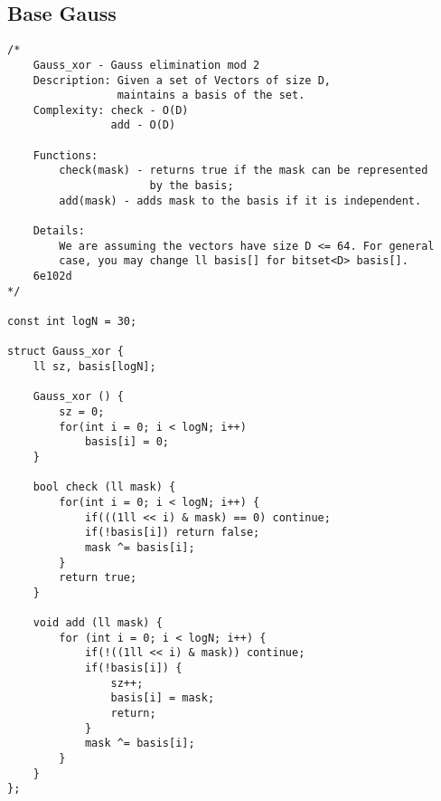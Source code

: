\documentclass{article}
\begin{document}
\subsection{Base Gauss}
\begin{verbatim}
/*
    Gauss_xor - Gauss elimination mod 2
    Description: Given a set of Vectors of size D,
                 maintains a basis of the set.
    Complexity: check - O(D)
                add - O(D)

    Functions:
        check(mask) - returns true if the mask can be represented
                      by the basis;
        add(mask) - adds mask to the basis if it is independent.

    Details:
        We are assuming the vectors have size D <= 64. For general
        case, you may change ll basis[] for bitset<D> basis[].
    6e102d
*/

const int logN = 30;

struct Gauss_xor {
    ll sz, basis[logN];

    Gauss_xor () {
        sz = 0;
        for(int i = 0; i < logN; i++)
            basis[i] = 0;
    }

    bool check (ll mask) {
        for(int i = 0; i < logN; i++) {
            if(((1ll << i) & mask) == 0) continue;
            if(!basis[i]) return false;
            mask ^= basis[i];
        }
        return true;
    }

    void add (ll mask) {
        for (int i = 0; i < logN; i++) {
            if(!((1ll << i) & mask)) continue;
            if(!basis[i]) {
                sz++;
                basis[i] = mask;
                return;
            }
            mask ^= basis[i];
        }
    }
};\end{verbatim}
\end{document}
